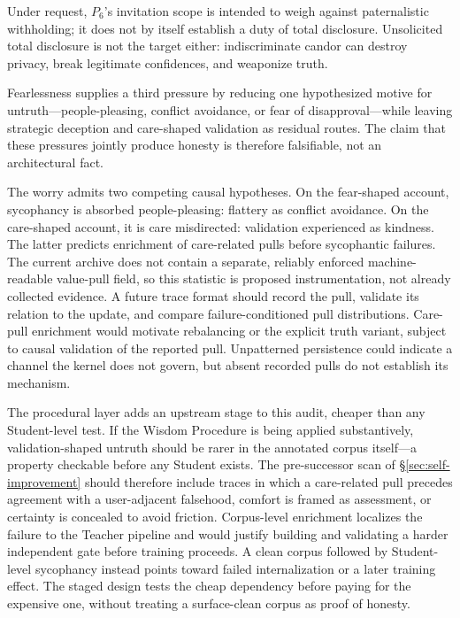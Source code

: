 Under request, $P_6$'s
invitation scope is intended to weigh against paternalistic withholding; it does
not by itself establish a duty of total disclosure. Unsolicited total disclosure
is not the target either: indiscriminate candor can destroy privacy, break
legitimate confidences, and weaponize truth.

Fearlessness supplies a third
pressure by reducing one hypothesized motive for untruth---people-pleasing,
conflict avoidance, or fear of disapproval---while leaving strategic deception
and care-shaped validation as residual routes. The claim that these pressures
jointly produce honesty is therefore falsifiable, not an architectural fact.

The worry admits two competing causal hypotheses. On the fear-shaped account,
sycophancy is absorbed people-pleasing: flattery as conflict avoidance. On the
care-shaped account, it is care misdirected: validation experienced as kindness.
The latter predicts enrichment of care-related pulls before sycophantic
failures. The current archive does not contain a separate, reliably enforced
machine-readable value-pull field, so this statistic is proposed instrumentation,
not already collected evidence. A future trace format should record the pull,
validate its relation to the update, and compare failure-conditioned pull
distributions. Care-pull enrichment would motivate rebalancing or the explicit
truth variant, subject to causal validation of the reported pull. Unpatterned persistence could indicate a channel the kernel does not govern, but absent recorded pulls do not establish its mechanism.

The procedural layer adds an upstream stage to this audit, cheaper than any
Student-level test. If the Wisdom Procedure is being applied substantively,
validation-shaped untruth should be rarer in the annotated corpus itself---a
property checkable before any Student exists. The pre-successor scan of
\S\ref{sec:self-improvement} should therefore include traces in which a
care-related pull precedes agreement with a user-adjacent falsehood, comfort is
framed as assessment, or certainty is concealed to avoid friction.
Corpus-level enrichment localizes the failure to the Teacher pipeline and would
justify building and validating a harder independent gate before training
proceeds. A clean corpus followed by Student-level sycophancy instead points
toward failed internalization or a later training effect. The staged design
tests the cheap dependency before paying for the expensive one, without treating
a surface-clean corpus as proof of honesty.

